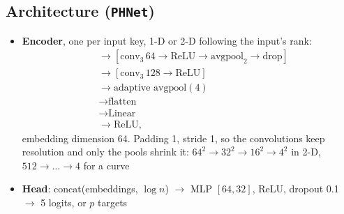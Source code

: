 \documentclass[11pt]{article}
\begin{document}
\subsection*{Architecture (\texttt{PHNet})}
\begin{itemize}
  \item \textbf{Encoder}, one per input key, 1-D or 2-D following the input's rank:
  \begin{align*}
    [\text{conv}_3\,32 \to \text{ReLU} \to \text{avgpool}_2 \to \text{drop}]
    & \to [\text{conv}_3\,64 \to \text{ReLU} \to \text{avgpool}_2 \to \text{drop}] \\
    & \to [\text{conv}_3\,128 \to \text{ReLU}] \\
    & \to \text{adaptive avgpool}(4) \\
    & \to \text{flatten} \\
    & \to \text{Linear} \\
    & \to \text{ReLU},
  \end{align*}
  embedding dimension 64. Padding 1, stride 1, so the convolutions keep resolution and only the pools shrink it: $64^2\to32^2\to16^2\to4^2$ in 2-D, $512\to\dots\to4$ for a curve
  \item \textbf{Head}: concat(embeddings, $\log n$) $\to$ MLP $[64,32]$, ReLU, dropout 0.1 $\to$ 5 logits, or $p$ targets
\end{itemize}
\end{document}
